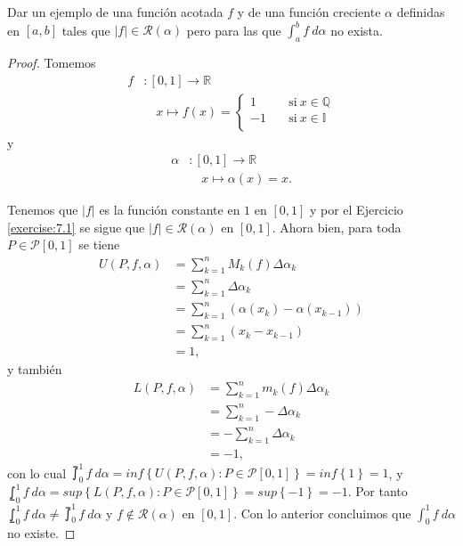 \begin{exercise}

Dar un ejemplo de una función acotada $f$ y de una función creciente $\alpha$ definidas en $\left[a,b\right]$ tales que $|f|\in\mathcal{R}\left(\alpha\right)$ pero para las que $\int_a^b f\ d\alpha$ no exista.

\end{exercise}

\renewcommand*{\proofname}{Solución}
\begin{proof}

Tomemos
\begin{align*}
f&:\left[0,1\right]\rightarrow \mathbb{R}\\
&\quad x\longmapsto f(x)=\begin{cases}
          1 \quad &\text{si}\ x \in \mathbb{Q} \\
          -1 \quad &\text{si}\ x \in \mathbb{I} \\
     \end{cases}
\end{align*}
y
\begin{align*}
\alpha&:\left[0,1\right]\rightarrow \mathbb{R}\\
&\quad x\longmapsto \alpha(x)=x.
\end{align*}

Tenemos que $|f|$ es la función constante en $1$ en $\left[0,1\right]$ y por el Ejercicio \ref{exercise:7.1} se sigue que $|f|\in\mathcal{R}\left(\alpha\right)$ en $\left[0,1\right]$. Ahora bien, para toda $P\in \mathcal{P}\left[0,1\right]$ se tiene
\begin{align*}
  U\left(P,f,\alpha\right)&=\sum_{k=1}^n M_k\left(f\right)\Delta\alpha_k\\
  &=\sum_{k=1}^n \Delta\alpha_k\\
  &=\sum_{k=1}^n \left(\alpha\left(x_k\right)-\alpha\left(x_{k-1}\right)\right)\\
  &=\sum_{k=1}^n \left(x_k-x_{k-1}\right)\\
  &=1,
\end{align*}
y también
\begin{align*}
  L\left(P,f,\alpha\right)&=\sum_{k=1}^n m_k\left(f\right)\Delta\alpha_k\\
  &=\sum_{k=1}^n -\Delta\alpha_k\\
  &=-\sum_{k=1}^n \Delta\alpha_k\\
  &=-1,
\end{align*}
con lo cual $\upint_0^1 f\ d\alpha=inf\left\lbrace U\left(P,f,\alpha\right):P\in\mathcal{P}\left[0,1\right]\right\rbrace=inf\left\lbrace 1\right\rbrace=1$, y $\lowint_0^1 f\ d\alpha=sup\left\lbrace L\left(P,f,\alpha\right):P\in\mathcal{P}\left[0,1\right]\right\rbrace=sup\left\lbrace -1\right\rbrace=-1$. Por tanto $\lowint_0^1 f\ d\alpha \neq \upint_0^1 f\ d\alpha$ y $f\notin\mathcal{R}\left(\alpha\right)$ en $\left[0,1\right]$. Con lo anterior concluimos que $\int_0^1 f\ d\alpha$ no existe.

\end{proof}
\renewcommand*{\proofname}{Prueba}

